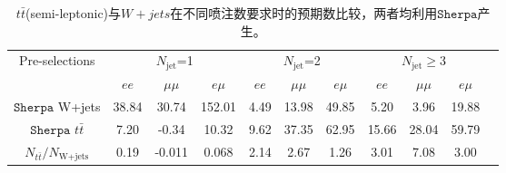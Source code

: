 \begin{table}[h]
\scriptsize
\begin{center}
\begin{tabular}{c|ccc|ccc|cccc}
\hline
\hline
Pre-selections     &\multicolumn{3}{c|}{$N_{\text{jet}}$=1}   &\multicolumn{3}{c|}{$N_{\text{jet}}$=2}   &\multicolumn{3}{c}{$N_{\text{jet}}\geq$3}  \\
                            &$ee$    &$\mu\mu$   &$e\mu$   &$ee$    &$\mu\mu$   &$e\mu$  &$ee$    &$\mu\mu$   &$e\mu$\\
$\texttt{Sherpa}$ W+jets     &38.84  &30.74    &152.01   &4.49    &13.98    &49.85   &5.20    &3.96     &19.88 \\   
$\texttt{Sherpa}$ $t\bar{t}$ &7.20   &-0.34     & 10.32   &9.62    &37.35    &62.95   &15.66   &28.04    &59.79 \\
\hline
$N_{t\bar{t}}/N_{\text{W+jets}}$  &0.19 &-0.011 &0.068   &2.14  &2.67   &1.26    &3.01  &7.08    &3.00 \\
\hline
\hline
\end{tabular}
\caption{$t\bar{t}$(semi-leptonic)与$W+jets$在不同喷注数要求时的预期数比较，两者均利用$\texttt{Sherpa}$产生。}
\label{tab:fractions_ttbarOverWjets}
\end{center}
\end{table}
